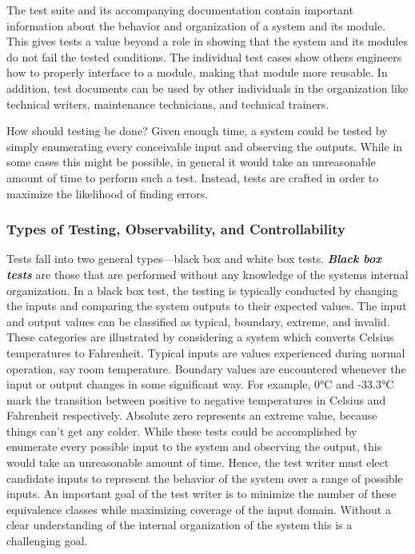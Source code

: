 The test suite and its accompanying documentation contain important
information about the behavior and organization of a system and its
module. This gives tests a value beyond a role in showing that the
system and its modules do not fail the tested conditions. The individual
test cases show others engineers how to properly interface to a module,
making that module more reusable. In addition, test documents can be
used by other individuals in the organization like technical writers,
maintenance technicians, and technical trainers.

How should testing be done? Given enough time, a system could be tested
by simply enumerating every conceivable input and observing the outputs.
While in some cases this might be possible, in general it would take an
unreasonable amount of time to perform such a test. Instead, tests are
crafted in order to maximize the likelihood of finding errors.

\subsubsection{Types of Testing, Observability, and
Controllability}\label{types-of-testing-observability-and-controllability}

Tests fall into two general types---black box and white box tests.
\emph{\textbf{Black box tests}} are those that are performed without any
knowledge of the systems internal organization. In a black box test, the
testing is typically conducted by changing the inputs and comparing the
system outputs to their expected values. The input and output values can
be classified as typical, boundary, extreme, and invalid. These
categories are illustrated by considering a system which converts
Celsius temperatures to Fahrenheit. Typical inputs are values
experienced during normal operation, say room temperature. Boundary
values are encountered whenever the input or output changes in some
significant way. For example, 0°C and -33.3°C mark the transition
between positive to negative temperatures in Celsius and Fahrenheit
respectively. Absolute zero represents an extreme value, because things
can't get any colder. While these tests could be accomplished by
enumerate every possible input to the system and observing the output,
this would take an unreasonable amount of time. Hence, the test writer
must elect candidate inputs to represent the behavior of the system over
a range of possible inputs. An important goal of the test writer is to
minimize the number of these equivalence classes while maximizing
coverage of the input domain. Without a clear understanding of the
internal organization of the system this is a challenging goal.

